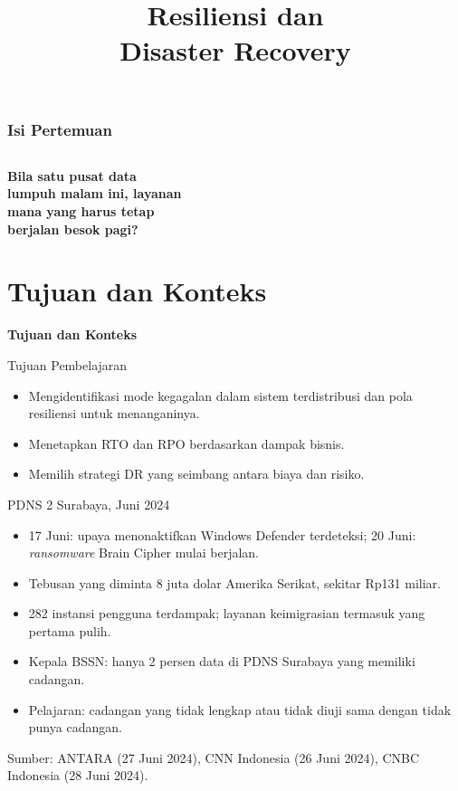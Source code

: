 \documentclass[aspectratio=169, table, 12pt]{beamer}
\title{\Huge Resiliensi dan\\ \vspace{10pt} Disaster Recovery}
\begin{document}
\frame{\titlepage}

\begin{frame}
  \frametitle{Isi Pertemuan}
  \vspace{14pt}
  \begin{columns}[t]
    {\small\tableofcontents[sections={1-4}]}

    {\small\tableofcontents[sections={5-8}]}
  \end{columns}
\end{frame}

\begin{frame}{\hfill}
  \centering
  \Huge{\textbf{Bila satu pusat data\\lumpuh malam ini, layanan\\mana yang harus tetap\\berjalan besok pagi?}}
\end{frame}

\section{Tujuan dan Konteks}

\begin{frame}{\hfill}
  \centering
  \Huge{\textbf{Tujuan dan Konteks}}
\end{frame}

\begin{frame}{{\Large Tujuan Pembelajaran}}
  \vspace{10pt}
  \begin{itemize}
    \item Mengidentifikasi mode kegagalan dalam sistem terdistribusi dan pola resiliensi untuk
          menanganinya.
    \item Menetapkan RTO dan RPO berdasarkan dampak bisnis.
    \item Memilih strategi DR yang seimbang antara biaya dan risiko.
  \end{itemize}
\end{frame}

\begin{frame}{{\Large PDNS 2 Surabaya, Juni 2024}}
  \vspace{6pt}
  \small
  \begin{itemize}
    \item 17 Juni: upaya menonaktifkan Windows Defender terdeteksi; 20 Juni: \textit{ransomware}
          Brain Cipher mulai berjalan.
    \item Tebusan yang diminta 8 juta dolar Amerika Serikat, sekitar Rp131 miliar.
    \item 282 instansi pengguna terdampak; layanan keimigrasian termasuk yang pertama pulih.
    \item Kepala BSSN: hanya 2 persen data di PDNS Surabaya yang memiliki cadangan.
    \item Pelajaran: cadangan yang tidak lengkap atau tidak diuji sama dengan tidak punya cadangan.
  \end{itemize}
  \vspace{4pt}
  {\footnotesize Sumber: ANTARA (27 Juni 2024), CNN Indonesia (26 Juni 2024), CNBC Indonesia
  (28 Juni 2024).}
\end{frame}
\end{document}
